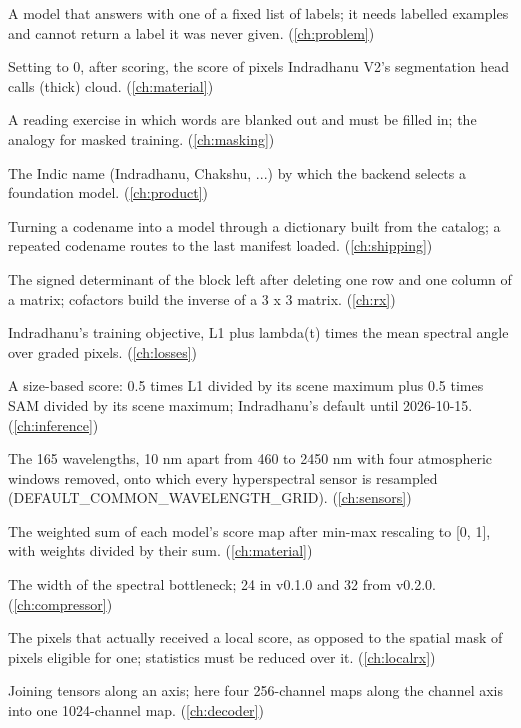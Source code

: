 \begin{description}[style=nextline,leftmargin=1.2em,font=\normalfont\bfseries]
\item[Classifier] A model that answers with one of a fixed list of labels; it needs labelled examples and cannot return a label it was never given. (\cref{ch:problem})
\item[Cloud exclusion] Setting to 0, after scoring, the score of pixels Indradhanu V2's segmentation head calls (thick) cloud. (\cref{ch:material})
\item[Cloze test] A reading exercise in which words are blanked out and must be filled in; the analogy for masked training. (\cref{ch:masking})
\item[Codename] The Indic name (Indradhanu, Chakshu, ...) by which the backend selects a foundation model. (\cref{ch:product})
\item[Codename routing] Turning a codename into a model through a dictionary built from the catalog; a repeated codename routes to the last manifest loaded. (\cref{ch:shipping})
\item[Cofactor] The signed determinant of the block left after deleting one row and one column of a matrix; cofactors build the inverse of a 3 x 3 matrix. (\cref{ch:rx})
\item[Combined loss] Indradhanu's training objective, L1 plus lambda(t) times the mean spectral angle over graded pixels. (\cref{ch:losses})
\item[Combined score] A size-based score: 0.5 times L1 divided by its scene maximum plus 0.5 times SAM divided by its scene maximum; Indradhanu's default until 2026-10-15. (\cref{ch:inference})
\item[Common wavelength grid] The 165 wavelengths, 10 nm apart from 460 to 2450 nm with four atmospheric windows removed, onto which every hyperspectral sensor is resampled (DEFAULT\_COMMON\_WAVELENGTH\_GRID). (\cref{ch:sensors})
\item[Composite score] The weighted sum of each model's score map after min-max rescaling to [0, 1], with weights divided by their sum. (\cref{ch:material})
\item[Compressed channels (D)] The width of the spectral bottleneck; 24 in v0.1.0 and 32 from v0.2.0. (\cref{ch:compressor})
\item[computed mask] The pixels that actually received a local score, as opposed to the spatial mask of pixels eligible for one; statistics must be reduced over it. (\cref{ch:localrx})
\item[Concatenation] Joining tensors along an axis; here four 256-channel maps along the channel axis into one 1024-channel map. (\cref{ch:decoder})

\end{description}
